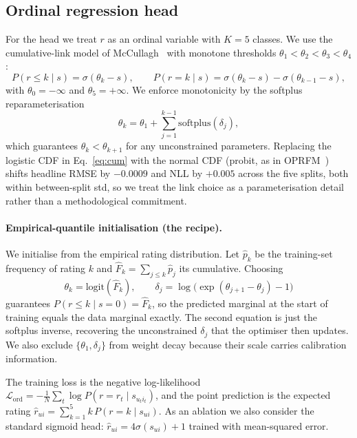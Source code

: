 \documentclass[a4paper]{article} %
\begin{document}
\subsection{Ordinal regression head}
\label{sec:method:head}
For the head we treat $r$ as an ordinal variable with $K=5$ classes. We use the
cumulative-link model of McCullagh~\cite{mccullagh1980ordinal} with monotone
thresholds $\theta_1<\theta_2<\theta_3<\theta_4$:
\begin{equation}
\label{eq:cum}
P(r\le k\mid s) = \sigma(\theta_k - s),\qquad
P(r=k\mid s) = \sigma(\theta_k - s)-\sigma(\theta_{k-1} - s),
\end{equation}
with $\theta_0=-\infty$ and $\theta_5=+\infty$. We enforce monotonicity by the
softplus reparameterisation
\begin{equation}
\label{eq:softplus}
\theta_k=\theta_1+\sum_{j=1}^{k-1}\mathrm{softplus}(\delta_j),
\end{equation}
which guarantees $\theta_k<\theta_{k+1}$ for any unconstrained parameters.
Replacing the logistic CDF in Eq.~\ref{eq:cum} with the normal CDF (probit, as
in OPRFM~\cite{zaman2025oprfm}) shifts headline RMSE by $-0.0009$ and NLL by
$+0.005$ across the five splits, both within between-split std, so we treat
the link choice as a parameterisation detail rather than a methodological
commitment.

\paragraph{Empirical-quantile initialisation (the recipe).}
We initialise from the empirical
rating distribution. Let $\hat p_k$ be the training-set frequency of rating
$k$ and $\hat F_k=\sum_{j\le k}\hat p_j$ its cumulative. Choosing
\begin{equation}
\label{eq:quantile-init}
\theta_k = \mathrm{logit}(\hat F_k),\qquad
\delta_j = \log\!\bigl(\exp(\theta_{j+1}-\theta_j) - 1\bigr)
\end{equation}
guarantees $P(r{\le}k\mid s{=}0)=\hat F_k$, so the predicted marginal at the
start of training equals the data marginal exactly. The second equation is
just the softplus inverse, recovering the unconstrained $\delta_j$ that the
optimiser then updates. We also exclude $\{\theta_1,\delta_j\}$ from weight
decay because their scale carries calibration information.

The training loss is the negative log-likelihood
$\mathcal{L}_{\mathrm{ord}}=-\frac{1}{N}\sum_t \log P(r=r_t\mid s_{u_ti_t})$,
and the point prediction is the expected rating
$\hat r_{ui}=\sum_{k=1}^{5}k\,P(r=k\mid s_{ui})$. As an ablation we also
consider the standard sigmoid head:
$\hat r_{ui}=4\sigma(s_{ui})+1$ trained with mean-squared error.
\end{document}
